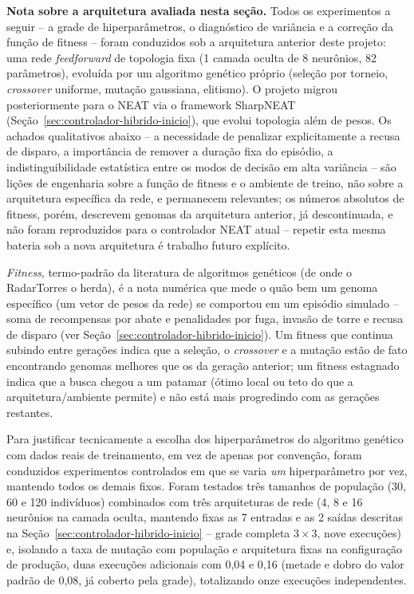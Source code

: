 \documentclass[12pt,a4paper]{article}
\begin{document}
\textbf{Nota sobre a arquitetura avaliada nesta seção.} Todos os experimentos a seguir -- a grade
de hiperparâmetros, o diagnóstico de variância e a correção da função de fitness -- foram
conduzidos sob a arquitetura anterior deste projeto: uma rede \textit{feedforward} de topologia
fixa (1 camada oculta de 8 neurônios, 82 parâmetros), evoluída por um algoritmo genético próprio
(seleção por torneio, \textit{crossover} uniforme, mutação gaussiana, elitismo). O projeto migrou
posteriormente para o NEAT via o framework SharpNEAT (Seção~\ref{sec:controlador-hibrido-inicio}),
que evolui topologia além de pesos. Os achados qualitativos abaixo -- a necessidade de penalizar
explicitamente a recusa de disparo, a importância de remover a duração fixa do episódio, a
indistinguibilidade estatística entre os modos de decisão em alta variância -- são lições de
engenharia sobre a função de fitness e o ambiente de treino, não sobre a arquitetura específica da
rede, e permanecem relevantes; os números absolutos de fitness, porém, descrevem genomas da
arquitetura anterior, já descontinuada, e não foram reproduzidos para o controlador NEAT atual --
repetir esta mesma bateria sob a nova arquitetura é trabalho futuro explícito.

\textit{Fitness}, termo-padrão da literatura de algoritmos genéticos (de onde o RadarTorres o
herda), é a nota numérica que mede o quão bem um genoma específico (um vetor de pesos da rede) se
comportou em um episódio simulado -- soma de recompensas por abate e penalidades por fuga, invasão
de torre e recusa de disparo (ver Seção~\ref{sec:controlador-hibrido-inicio}). Um fitness que
continua subindo entre gerações indica que a seleção, o \textit{crossover} e a mutação estão de
fato encontrando genomas melhores que os da geração anterior; um fitness estagnado indica que a
busca chegou a um patamar (ótimo local ou teto do que a arquitetura/ambiente permite) e não está
mais progredindo com as gerações restantes.

Para justificar tecnicamente a escolha dos hiperparâmetros do algoritmo genético com dados reais de
treinamento, em vez de apenas por convenção, foram conduzidos experimentos controlados em que se
varia \emph{um} hiperparâmetro por vez, mantendo todos os demais fixos. Foram testados três
tamanhos de população (30, 60 e 120 indivíduos) combinados com três arquiteturas de rede (4, 8 e 16
neurônios na camada oculta, mantendo fixas as 7 entradas e as 2 saídas descritas na
Seção~\ref{sec:controlador-hibrido-inicio} -- grade completa $3\times3$, nove execuções) e, isolando
a taxa de mutação com população e arquitetura fixas na configuração de produção, duas execuções
adicionais com 0,04 e 0,16 (metade e dobro do valor padrão de 0,08, já coberto pela grade),
totalizando onze execuções independentes.
\end{document}
